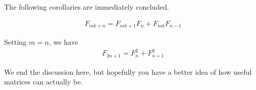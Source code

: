 The following corollaries are immediately concluded.

\begin{corollary}
\begin{align*}
F_{mk+n}=F_{mk+1}F_n+F_{mk}F_{n-1}
\end{align*}
\end{corollary}

\begin{corollary}
Setting $m=n$, we have
\begin{align*}
F_{2n+1}=F_n^2+F_{n+1}^2
\end{align*}
\end{corollary}

We end the discussion here, but hopefully you have a better idea of how useful matrices can actually be.
